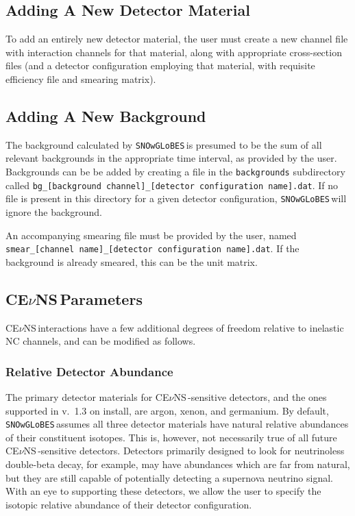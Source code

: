 \documentclass{article}
\newcommand{\cev}{CE$\nu$NS\,}
\newcommand{\snow}{\texttt{SNOwGLoBES}\,}
\begin{document}
\subsection{Adding A New Detector Material}

To add an entirely new detector material, the user must create a new channel file with interaction channels for that material, along with appropriate cross-section files (and a detector configuration employing that material, with requisite efficiency file and smearing matrix).

\subsection{Adding A New Background}

The background calculated by \snow is presumed to be the sum of all relevant backgrounds in the appropriate time interval, as provided by the user.  Backgrounds can be be added by creating a file in the \texttt{backgrounds} subdirectory called \texttt{bg\_[background channel]\_[detector configuration name].dat}. If no file is present in this directory for a given detector configuration, \snow will ignore the background.

An accompanying smearing file must be provided by the user, named \texttt{smear\_[channel name]\_[detector configuration name].dat}. If the background is already smeared, this can be the unit matrix.

\subsection{\cev Parameters}

\cev interactions have a few additional degrees of freedom relative to inelastic NC channels, and can be modified as follows.

\subsubsection{Relative Detector Abundance} \label{sssec:relabun}

The primary detector materials for \cev-sensitive detectors, and the ones supported in v.~1.3 on install, are argon, xenon, and germanium. By default, \snow assumes all three detector materials have natural relative abundances of their constituent isotopes. This is, however, not necessarily true of all future \cev-sensitive detectors. Detectors primarily designed to look for neutrinoless double-beta decay, for example, may have abundances which are far from natural, but they are still capable of potentially detecting a supernova neutrino signal. With an eye to supporting these detectors, we allow the user to specify the isotopic relative abundance of their detector configuration. 
\end{document}
